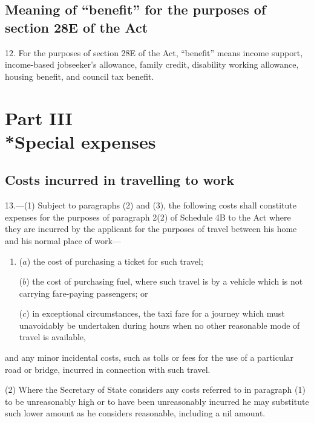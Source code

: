 \documentclass[12pt,a4paper]{article}
\begin{document}

\subsection[12. Meaning of “benefit” for the purposes of section 28E of the Act]{Meaning of “benefit” for the purposes of section 28E of the Act}

12. For the
purposes of section 28E of the Act, “benefit” means income support, income-based
jobseeker’s allowance, family credit, disability working allowance, housing
benefit, and council tax benefit.

\section[Part III --- Special expenses]{Part III\\*Special expenses}

\renewcommand\parthead{--- Part III}

\subsection[13. Costs incurred in travelling to work]{Costs incurred in travelling to work}

13.—(1) Subject to
paragraphs (2) and (3), the following costs shall constitute expenses for the
purposes of paragraph 2(2) of Schedule 4B to the Act where they are incurred by
the applicant for the purposes of travel between his home and his normal place
of work—
\begin{enumerate}\item[]
($a$) the cost of purchasing a ticket for such travel;

($b$) the cost of purchasing fuel, where such travel is by a vehicle which is not
carrying fare-paying passengers; or

($c$) in exceptional circumstances, the taxi fare for a journey which must
unavoidably be undertaken during hours when no other reasonable mode of travel
is available,
\end{enumerate}
and any minor incidental costs, such as tolls or fees for the use of a
particular road or bridge, incurred in connection with such travel.

(2) Where the Secretary of State considers any costs referred to in paragraph
(1) to be unreasonably high or to have been unreasonably incurred he may
substitute such lower amount as he considers reasonable, including a nil amount.
\end{document}
